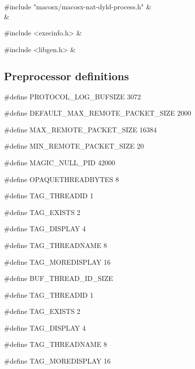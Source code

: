 \medskip
\begin{cxreftabi}
{\stt \#include "macosx/macosx-nat-dyld-process.h"} &\\
\hspace*{0.2in}{\stt \#include "defs.h"} &\\
\end{cxreftabi}

\medskip
\begin{cxreftabi}
{\stt \#include <execinfo.h>} &\\
\end{cxreftabi}

\medskip
\begin{cxreftabi}
{\stt \#include <libgen.h>} &\\
\end{cxreftabi}


\subsection*{Preprocessor definitions}

{\stt \#define PROTOCOL\_LOG\_BUFSIZE 3072}

\medskip
{\stt \#define DEFAULT\_MAX\_REMOTE\_PACKET\_SIZE 2000}

\medskip
{\stt \#define MAX\_REMOTE\_PACKET\_SIZE 16384}

\medskip
{\stt \#define MIN\_REMOTE\_PACKET\_SIZE 20}

\medskip
{\stt \#define MAGIC\_NULL\_PID 42000}

\medskip
{\stt \#define OPAQUETHREADBYTES 8}

\medskip
{\stt \#define TAG\_THREADID 1}

\medskip
{\stt \#define TAG\_EXISTS 2}

\medskip
{\stt \#define TAG\_DISPLAY 4}

\medskip
{\stt \#define TAG\_THREADNAME 8}

\medskip
{\stt \#define TAG\_MOREDISPLAY 16}

\medskip
{\stt \#define BUF\_THREAD\_ID\_SIZE}

\medskip
{\stt \#define TAG\_THREADID 1}

\medskip
{\stt \#define TAG\_EXISTS 2}

\medskip
{\stt \#define TAG\_DISPLAY 4}

\medskip
{\stt \#define TAG\_THREADNAME 8}

\medskip
{\stt \#define TAG\_MOREDISPLAY 16}


